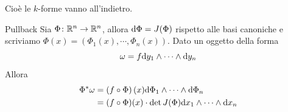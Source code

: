 \documentclass[a4paper]{article}
\begin{document}
Cioè le \(k\)-forme vanno all'indietro.

\begin{snippetexample}{Pullback}
    Sia \(\Phi \colon \mathbb{R}^n \to \mathbb{R}^n\),
    allora \(\text d\Phi = J(\Phi)\) rispetto alle basi canoniche e scriviamo
    \(\Phi(x) = (\Phi_1(x), \cdots, \Phi_n(x))\).
    Dato un oggetto della forma \[
        \omega = f \text dy_1 \wedge \cdots \wedge \text dy_n
    \]
    Allora \begin{align*}
        \Phi^* \omega
        &= \left(
            f \circ \Phi
        \right)(x) \text d\Phi_1 \wedge \cdots \wedge \text d\Phi_n \\
        &= (f \circ \Phi)(x) \cdot \det J(\Phi) \text dx_1 \wedge \cdots \wedge \text dx_n
    \end{align*}
\end{snippetexample}
\end{document}
